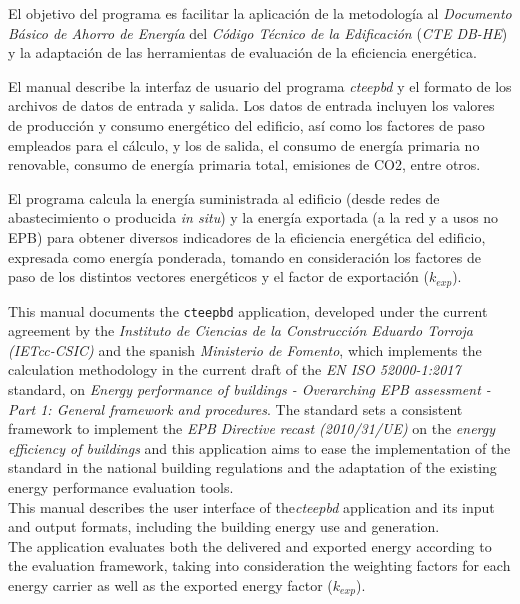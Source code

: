 \documentclass[10pt,notitlepage,oneside,a4paper]{article}
\begin{document}
El objetivo del programa es facilitar la aplicación de la metodología al \textit{Documento Básico de Ahorro de Energía} del \textit{Código Técnico de la Edificación} (\textit{CTE DB-HE}) y la adaptación de las herramientas de evaluación de la eficiencia energética.

El manual describe la interfaz de usuario del programa \textit{cteepbd} y el formato de los archivos de datos de entrada y salida. Los datos de entrada incluyen los valores de producción y consumo energético del edificio, así como los factores de paso empleados para el cálculo, y los de salida, el consumo de energía primaria no renovable, consumo de energía primaria total, emisiones de CO2, entre otros.

El programa calcula la energía suministrada al edificio (desde redes de abastecimiento o producida \textit{in situ}) y la energía exportada (a la red y a usos no EPB) para obtener diversos indicadores de la eficiencia energética del edificio, expresada como energía ponderada, tomando en consideración los factores de paso de los distintos vectores energéticos y el factor de exportación ($k_{exp}$).

\begin{myquote}\footnotesize
    This manual documents the \texttt{cteepbd} application, developed under the current agreement by the \textit{Instituto de Ciencias de la Construcción Eduardo Torroja (IETcc-CSIC)} and the spanish \textit{Ministerio de Fomento}, which implements the calculation methodology in the current draft of the \textit{EN ISO 52000-1:2017} standard, on \textit{Energy performance of buildings - Overarching EPB assessment - Part 1: General framework and procedures}. The standard sets a consistent framework to implement the \textit{EPB Directive recast (2010/31/UE)} on the \textit{energy efficiency of buildings} and this application aims to ease the implementation of the standard in the national building regulations and the adaptation of the existing energy performance evaluation tools.
    \\

    This manual describes the user interface of the\textit{cteepbd} application and its input and output formats, including the building energy use and generation.
    \\

    The application evaluates both the delivered and exported energy according to the evaluation framework, taking into consideration the weighting factors for each energy carrier as well as the exported energy factor ($k_{exp}$).
\end{myquote}
\end{document}
